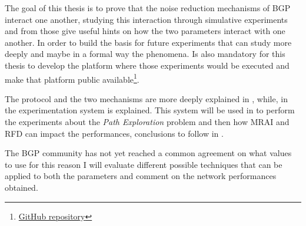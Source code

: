 
The goal of this thesis is to prove that the noise reduction mechanisms of \ac{BGP}
interact one another, studying this interaction through simulative experiments
and from those give useful hints on how the two parameters interact with one another.
In order to build the basis for future experiments that can study more deeply
and maybe in a formal way the phenomena.
Is also mandatory for this thesis to develop the platform where those experiments
would be executed and make that platform public
available\footnote{\href{https://github.com/tiamilani/BGPFSM}{GitHub repository}}.

The protocol and the two mechanisms are more deeply explained in ,
while, in  the experimentation system is explained.
This system will be used in
to perform the experiments about the \textit{Path Exploration} problem and then
how \ac{MRAI} and \ac{RFD} can impact the performances, conclusions to follow
in .

The \ac{BGP} community has not yet reached a common agreement on what values
to use for this reason I will evaluate different possible techniques that can
be applied to both the parameters and comment on the network performances obtained.

